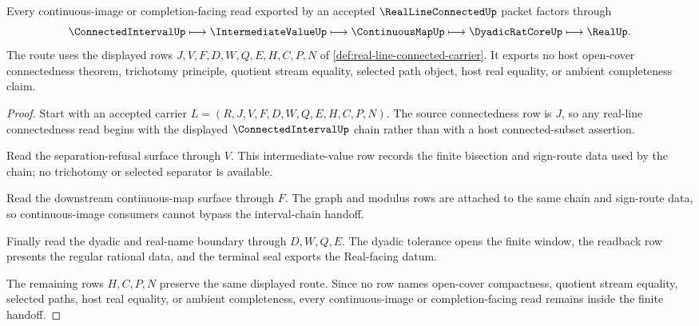 \begin{theorem}
\label{thm:real-line-connected-interval-chain-handoff}
Every continuous-image or completion-facing read exported by an accepted $\RealLineConnectedUp$ packet factors through
$$
\ConnectedIntervalUp \longmapsto \IntermediateValueUp \longmapsto \ContinuousMapUp \longmapsto \DyadicRatCoreUp \longmapsto \RealUp .
$$
The route uses the displayed rows $J,V,F,D,W,Q,E,H,C,P,N$ of \autoref{def:real-line-connected-carrier}. It exports no host open-cover connectedness theorem, trichotomy principle, quotient stream equality, selected path object, host real equality, or ambient completeness claim.
\end{theorem}
\begin{proof}
Start with an accepted carrier $L=(R,J,V,F,D,W,Q,E,H,C,P,N)$. The source connectedness row is $J$, so any real-line connectedness read begins with the displayed $\ConnectedIntervalUp$ chain rather than with a host connected-subset assertion.

Read the separation-refusal surface through $V$. This intermediate-value row records the finite bisection and sign-route data used by the chain; no trichotomy or selected separator is available.

Read the downstream continuous-map surface through $F$. The graph and modulus rows are attached to the same chain and sign-route data, so continuous-image consumers cannot bypass the interval-chain handoff.

Finally read the dyadic and real-name boundary through $D,W,Q,E$. The dyadic tolerance opens the finite window, the readback row presents the regular rational data, and the terminal seal exports the Real-facing datum.

The remaining rows $H,C,P,N$ preserve the same displayed route. Since no row names open-cover compactness, quotient stream equality, selected paths, host real equality, or ambient completeness, every continuous-image or completion-facing read remains inside the finite handoff.
\end{proof}


